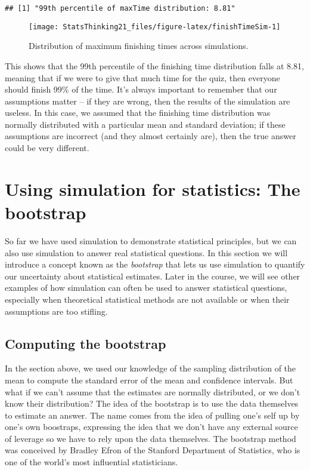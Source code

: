 \documentclass[]{book}
\theoremstyle{definition}
\theoremstyle{definition}
\theoremstyle{definition}
\theoremstyle{remark}
\begin{document}
\begin{verbatim}
## [1] "99th percentile of maxTime distribution: 8.81"
\end{verbatim}

\begin{figure}
\texttt{[image: StatsThinking21\_files/figure-latex/finishTimeSim-1]} \caption{Distribution of maximum finishing times across simulations.}\label{fig:finishTimeSim}
\end{figure}

This shows that the 99th percentile of the finishing time distribution
falls at 8.81, meaning that if we were to give that much time for the
quiz, then everyone should finish 99\% of the time. It's always
important to remember that our assumptions matter -- if they are wrong,
then the results of the simulation are useless. In this case, we assumed
that the finishing time distribution was normally distributed with a
particular mean and standard deviation; if these assumptions are
incorrect (and they almost certainly are), then the true answer could be
very different.

\section{Using simulation for statistics: The
bootstrap}\label{using-simulation-for-statistics-the-bootstrap}

So far we have used simulation to demonstrate statistical principles,
but we can also use simulation to answer real statistical questions. In
this section we will introduce a concept known as the \emph{bootstrap}
that lets us use simulation to quantify our uncertainty about
statistical estimates. Later in the course, we will see other examples
of how simulation can often be used to answer statistical questions,
especially when theoretical statistical methods are not available or
when their assumptions are too stifling.

\subsection{Computing the bootstrap}\label{computing-the-bootstrap}

In the section above, we used our knowledge of the sampling distribution
of the mean to compute the standard error of the mean and confidence
intervals. But what if we can't assume that the estimates are normally
distributed, or we don't know their distribution? The idea of the
bootstrap is to use the data themselves to estimate an answer. The name
comes from the idea of pulling one's self up by one's own boostraps,
expressing the idea that we don't have any external source of leverage
so we have to rely upon the data themselves. The bootstrap method was
conceived by Bradley Efron of the Stanford Department of Statistics, who
is one of the world's most influential statisticians.
\end{document}
